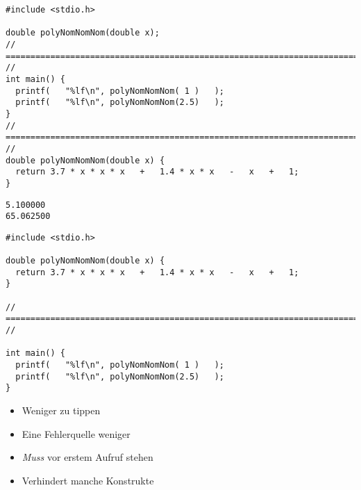 
\begin{frame}[fragile]
%
\begin{codebox}
\begin{verbatim}
#include <stdio.h>

double polyNomNomNom(double x);
// ========================================================================= //
int main() {
  printf(   "%lf\n", polyNomNomNom( 1 )   );
  printf(   "%lf\n", polyNomNomNom(2.5)   );
}
// ========================================================================= //
double polyNomNomNom(double x) {
  return 3.7 * x * x * x   +   1.4 * x * x   -   x   +   1;
}
\end{verbatim}
\end{codebox}
%
\begin{cmdbox}[Ausgabe]
\begin{verbatim}
5.100000
65.062500
\end{verbatim}
\end{cmdbox}
%
\end{frame}


\begin{frame}[fragile]
%
\begin{codebox}
\begin{verbatim}
#include <stdio.h>

double polyNomNomNom(double x) {
  return 3.7 * x * x * x   +   1.4 * x * x   -   x   +   1;
}

// ========================================================================= //

int main() {
  printf(   "%lf\n", polyNomNomNom( 1 )   );
  printf(   "%lf\n", polyNomNomNom(2.5)   );
}
\end{verbatim}
\end{codebox}
%
\begin{tcbraster}[raster columns=2,
                  raster equal height,
                  nobeforeafter,
                  raster column skip=0.2cm]
\begin{hintbox}[Vorteile]
\small
\begin{itemize}
\item Weniger zu tippen
\item Eine Fehlerquelle weniger
\end{itemize}
\end{hintbox}
%
\begin{warnbox}[Nachteile]
\small
\begin{itemize}
\item \emph{Muss} vor erstem Aufruf stehen
\item Verhindert manche Konstrukte
\end{itemize}
\end{warnbox}
\end{tcbraster}
%
\end{frame}


